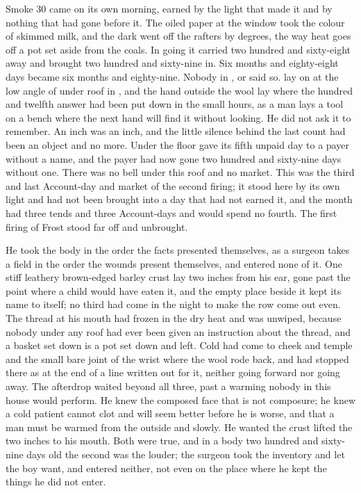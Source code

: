 
Smoke 30 came on its own morning, earned by the light that made it and by nothing that had gone before it. The oiled paper at the window took the colour of skimmed milk, and the dark went off the rafters by degrees, the way heat goes off a pot set aside from the coals. In going it carried two hundred and sixty-eight away and brought two hundred and sixty-nine in. Six months and eighty-eight days became six months and eighty-nine. Nobody in ,  or  said so.  lay on  at the low angle of  under  roof in , and the hand outside the wool lay where the hundred and twelfth answer had been put down in the small hours, as a man lays a tool on a bench where the next hand will find it without looking. He did not ask it to remember. An inch was an inch, and the little silence behind the last count had been an object and no more. Under the floor  gave its fifth unpaid day to a payer without a name, and the payer had now gone two hundred and sixty-nine days without one. There was no bell under this roof and no market. This was the third and last Account-day and market of the second firing; it stood here by its own light and had not been brought into a day that had not earned it, and the month had three tends and three Account-days and would spend no fourth. The first firing of Frost stood far off and unbrought.

He took the body in the order the facts presented themselves, as a surgeon takes a field in the order the wounds present themselves, and entered none of it. One stiff leathery brown-edged barley crust lay two inches from his ear, gone past the point where a child would have eaten it, and the empty place beside it kept its name to itself; no third had come in the night to make the row come out even. The thread at his mouth had frozen in the dry heat and was unwiped, because nobody under any roof had ever been given an instruction about the thread, and a basket set down is a pot set down and left. Cold had come to cheek and temple and the small bare joint of the wrist where the wool rode back, and had stopped there as at the end of a line written out for it, neither going forward nor going away. The afterdrop waited beyond all three, past a warming nobody in this house would perform. He knew the composed face that is not composure; he knew a cold patient cannot clot and will seem better before he is worse, and that a man must be warmed from the outside and slowly. He wanted the crust lifted the two inches to his mouth. Both were true, and in a body two hundred and sixty-nine days old the second was the louder; the surgeon took the inventory and let the boy want, and entered neither, not even on the place where he kept the things he did not enter.

